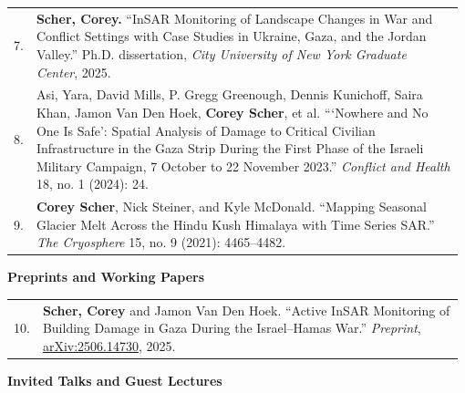 \documentclass[letterpaper,11pt,oneside]{article}
\begin{document}
\begin{longtable}{@{}p{0.03\linewidth}p{0.95\linewidth}@{}}
7. & \textbf{Scher, Corey.} “InSAR Monitoring of Landscape Changes in War and Conflict Settings with Case Studies in Ukraine, Gaza, and the Jordan Valley.” Ph.D. dissertation, \textit{City University of New York Graduate Center}, 2025.\\[1.0ex]

8. & Asi, Yara, David Mills, P. Gregg Greenough, Dennis Kunichoff, Saira Khan, Jamon Van Den Hoek, \textbf{Corey Scher}, et al. “‘Nowhere and No One Is Safe’: Spatial Analysis of Damage to Critical Civilian Infrastructure in the Gaza Strip During the First Phase of the Israeli Military Campaign, 7 October to 22 November 2023.” \textit{Conflict and Health} 18, no. 1 (2024): 24.\\[1.0ex]

9. & \textbf{Corey Scher}, Nick Steiner, and Kyle McDonald. “Mapping Seasonal Glacier Melt Across the Hindu Kush Himalaya with Time Series SAR.” \textit{The Cryosphere} 15, no. 9 (2021): 4465–4482.\\[1.0ex]

\end{longtable}
\vspace{-4ex}
\begin{flushleft}\textbf{Preprints and Working Papers}\end{flushleft}
\vspace{-4ex}
\begin{longtable}{@{}p{0.03\linewidth}p{0.95\linewidth}@{}}

10. & \textbf{Scher, Corey} and Jamon Van Den Hoek. “Active InSAR Monitoring of Building Damage in Gaza During the Israel–Hamas War.” \textit{Preprint}, \href{https://arxiv.org/abs/2506.14730}{arXiv:2506.14730}, 2025.\\[1.0ex]

\end{longtable}
\vspace{-4ex}
\begin{flushleft}\textbf{\Large{Invited Talks and Guest Lectures}}\end{flushleft}
\vspace{-4ex}
\end{document}
